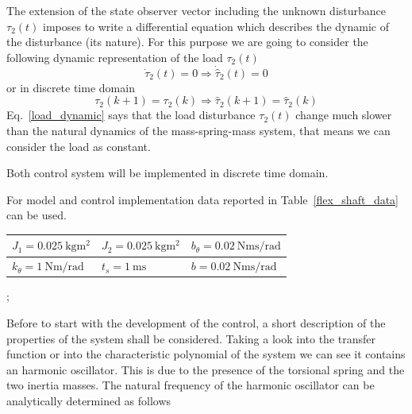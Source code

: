 \documentclass[12pt,a4paper,oneside]{book}
\begin{document}
\begin{onehalfspace}
The extension of the state observer vector including the unknown disturbance 
$\tau_2(t)$ imposes to write a differential equation which describes the 
dynamic of the disturbance (its nature). For this purpose we are going to 
consider the following dynamic representation of the load $\tau_2(t)$ 
\begin{equation}\label{load_dynamic}
	\dot{\tau}_2(t)=0 \Rightarrow \dot{\hat{\tau}}_2(t)=0 
\end{equation}
or in discrete time domain
\begin{equation}
	\tau_2(k+1)=\tau_2(k)\Rightarrow\hat{\tau}_2(k+1)=\hat{\tau}_2(k)
\end{equation}
Eq.~\eqref{load_dynamic} says that the load disturbance $\tau_2(t)$ change much 
slower than the natural dynamics of the mass-spring-mass system, that means we 
can consider the load as constant.

Both control system will be implemented in discrete time domain.

For model and control implementation data reported in Table~\ref{flex_shaft_data} can be used.
\begin{center}
	\setlength{\extrarowheight}{6pt}
	\begin{tabular}{ | m{10em} | m{10em} | m{10em} |}
		\hline
		$J_1 = \SI{0.025}{\kilogram\square\meter}$ & $J_2 = 
		\SI{0.025}{\kilogram\square\meter}$ & $b_{\theta} = 
		\SI{0.02}{\newton\meter\second\per\radian}$ \\[6pt]
		\hline
		$k_{\theta} = \SI{1}{\newton\meter\per\radian}$ & 
		$t_s = \SI{1}{\milli\second}$ &  $b = 
		\SI{0.02}{\newton\meter\second\per\radian}$ \\[6pt]
		\hline
	\end{tabular}
	\captionsetup{width=0.5\textwidth, font=small};	
	\label{flex_shaft_data}
\end{center}




Before to start with the development of the control, a short description of the properties of the system shall be considered. Taking a look into the transfer function or into the characteristic polynomial of the system we can see it contains an harmonic oscillator. This is due to the presence of the torsional spring and the two inertia masses. The natural frequency of the harmonic oscillator can be analytically determined as follows


\end{onehalfspace}
\end{document}
